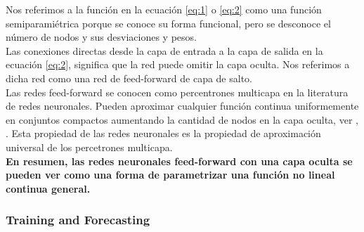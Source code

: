 	Nos referimos a la funci\'on en la ecuaci\'on \ref{eq:1} o \ref{eq:2} como una funci\'on semiparami\'etrica porque se conoce su forma funcional, pero se desconoce el n\'umero de nodos y sus desviaciones y pesos.\\
	Las conexiones directas desde la capa de entrada a la capa de salida en la ecuaci\'on \ref{eq:2}, significa que la red puede omitir la capa oculta. Nos referimos a dicha red como una red de feed-forward de capa de salto.\\
	Las redes feed-forward se conocen como percentrones multicapa en la literatura de redes neuronales. Pueden aproximar cualquier funci\'on continua uniformemente en conjuntos compactos aumentando la cantidad de nodos en la capa oculta, ver \cite{hornik1989multilayer}, \cite{chen1995universal}. Esta propiedad de las redes neuronales es la propiedad de aproximaci\'on universal de los percetrones multicapa. \\
	\textbf{En resumen, las redes neuronales feed-forward con una capa oculta se pueden ver como una forma de parametrizar una funci\'on no lineal continua general.}
	
	\subsubsection{\textbf{Training and Forecasting}}	
	
